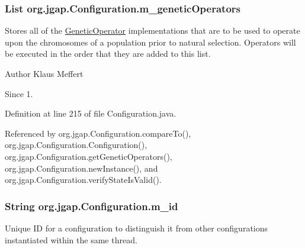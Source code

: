 \hypertarget{classorg_1_1jgap_1_1_configuration_a5c1c959a3176d21aecca50807c6001f8}{
\subsubsection[{m\-\_\-genetic\-Operators}]{\setlength{\rightskip}{0pt plus 5cm}List org.\-jgap.\-Configuration.\-m\-\_\-genetic\-Operators\hspace{0.3cm}{\ttfamily [private]}}}\label{classorg_1_1jgap_1_1_configuration_a5c1c959a3176d21aecca50807c6001f8}
Stores all of the \hyperlink{interfaceorg_1_1jgap_1_1_genetic_operator}{Genetic\-Operator} implementations that are to be used to operate upon the chromosomes of a population prior to natural selection. Operators will be executed in the order that they are added to this list.

\begin{DoxyAuthor}{Author}
Klaus Meffert 
\end{DoxyAuthor}
\begin{DoxySince}{Since}
1. 
\end{DoxySince}


Definition at line 215 of file Configuration.\-java.



Referenced by org.\-jgap.\-Configuration.\-compare\-To(), org.\-jgap.\-Configuration.\-Configuration(), org.\-jgap.\-Configuration.\-get\-Genetic\-Operators(), org.\-jgap.\-Configuration.\-new\-Instance(), and org.\-jgap.\-Configuration.\-verify\-State\-Is\-Valid().

\hypertarget{classorg_1_1jgap_1_1_configuration_aec6f6b65a70c6bb305eeff95bb64032c}{
\subsubsection[{m\-\_\-id}]{\setlength{\rightskip}{0pt plus 5cm}String org.\-jgap.\-Configuration.\-m\-\_\-id\hspace{0.3cm}{\ttfamily [private]}}}\label{classorg_1_1jgap_1_1_configuration_aec6f6b65a70c6bb305eeff95bb64032c}
Unique I\-D for a configuration to distinguish it from other configurations instantiated within the same thread.

